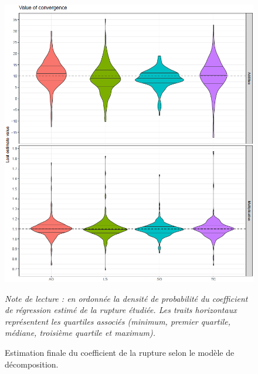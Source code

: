 \documentclass[12pt, a4paper, french]{article}
\begin{document}
\begin{figure}[!ht]
\begin{center}
 \includegraphics[scale=0.65]{img/OutliersValue.png}
 \caption[Estimation finale du coefficient de la rupture selon le modèle de décomposition]{Estimation finale du coefficient de la rupture selon le modèle de décomposition.}
 \label{fig:OutliersValue}
\end{center}\vspace{-0.3cm}
\footnotesize
\emph{Note de lecture : en ordonnée la densité de probabilité du coefficient de régression estimé de la rupture étudiée. Les traits horizontaux représentent les quartiles associés (minimum, premier quartile, médiane, troisième quartile et maximum).}
\end{figure}

\clearpage
\end{document}
